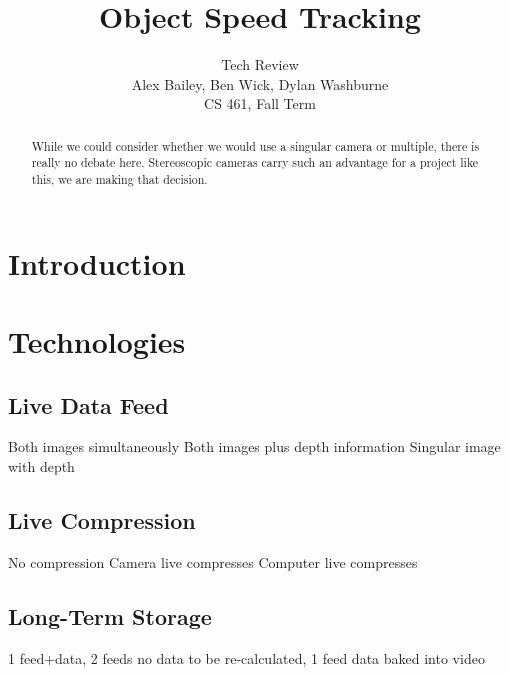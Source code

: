 \documentclass[letterpaper,10pt,onecolumn,draftclsnofoot]{IEEEtran}
\title{Object Speed Tracking}
\author{Tech Review\\Alex Bailey, Ben Wick, Dylan Washburne\\CS 461, Fall Term}
\begin{document}
\begin{titlepage}

\maketitle

\begin{abstract}
While we could consider whether we would use a singular camera or multiple, there is really no debate here.
Stereoscopic cameras carry such an advantage for a project like this, we are making that decision.
 
\end{abstract}

\end{titlepage}

\tableofcontents
\newpage

\section{Introduction}

\section{Technologies}

\subsection{Live Data Feed} %

Both images simultaneously
Both images plus depth information
Singular image with depth

\newpage
\subsection{Live Compression} %

No compression
Camera live compresses
Computer live compresses

\newpage
\subsection{Long-Term Storage}%

1 feed+data, 
2 feeds no data to be re-calculated, 
1 feed data baked into video

\newpage
\end{document}

